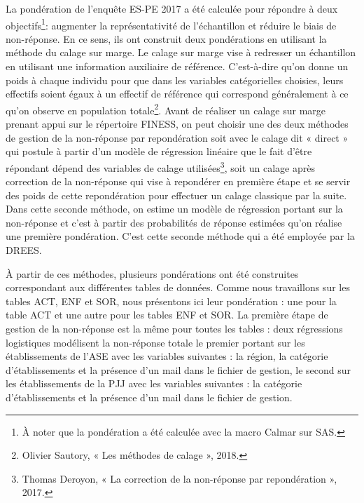 \documentclass[
  12,
  a4paper,
]{report}
\begin{document}
\begin{mdframed}[frametitle=La pondération dans l’enquête ES-PE 2017]

La pondération de l’enquête ES-PE 2017 a été calculée pour répondre à deux objectifs\footnote{À noter que la pondération a été calculée avec la macro Calmar sur SAS.}: augmenter la représentativité de l’échantillon et réduire le biais de non-réponse. En ce sens, ils ont construit deux pondérations en utilisant la méthode du calage sur marge. Le calage sur marge vise à redresser un échantillon en utilisant une information auxiliaire de référence. C’est-à-dire qu’on donne un poids à chaque individu pour que dans les variables catégorielles choisies, leurs effectifs soient égaux à un effectif de référence qui correspond généralement à ce qu’on observe en population totale\footnote{Olivier Sautory, « Les méthodes de calage », 2018.}. Avant de réaliser un calage sur marge prenant appui sur le répertoire FINESS, on peut choisir une des deux méthodes de gestion de la non-réponse par repondération soit avec le calage dit « direct » qui postule à partir d’un modèle de régression linéaire que le fait d’être répondant dépend des variables de calage utilisées\footnote{Thomas Deroyon, « La correction de la non-réponse par repondération », 2017.}, soit un calage après correction de la non-réponse qui vise à repondérer en première étape et se servir des poids de cette repondération pour effectuer un calage classique par la suite. Dans cette seconde méthode, on estime un modèle de régression portant sur la non-réponse et c’est à partir des probabilités de réponse estimées qu’on réalise une première pondération. C’est cette seconde méthode qui a été employée par la DREES.

À partir de ces méthodes, plusieurs pondérations ont été construites correspondant aux différentes tables de données. Comme nous travaillons sur les tables ACT, ENF et SOR, nous présentons ici leur pondération : une pour la table ACT et une autre pour les tables ENF et SOR. La première étape de gestion de la non-réponse est la même pour toutes les tables : deux régressions logistiques modélisent la non-réponse totale le premier portant sur les établissements de l’ASE avec les variables suivantes : la région, la catégorie d'établissements et la présence d'un mail dans le fichier de gestion, le second sur les établissements de la PJJ avec les variables suivantes : la catégorie d'établissements et la présence d'un mail dans le fichier de gestion.


\end{mdframed}
\end{document}
